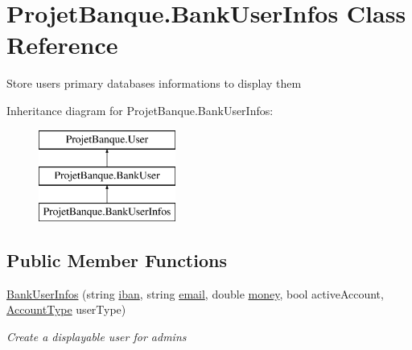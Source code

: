 \hypertarget{class_projet_banque_1_1_bank_user_infos}{}\section{Projet\+Banque.\+Bank\+User\+Infos Class Reference}
\label{class_projet_banque_1_1_bank_user_infos}


Store user\textquotesingle{}s primary databases informations to display them  


Inheritance diagram for Projet\+Banque.\+Bank\+User\+Infos\+:\begin{figure}[H]
\begin{center}
\leavevmode
\includegraphics[height=3.000000cm]{class_projet_banque_1_1_bank_user_infos}
\end{center}
\end{figure}
\subsection*{Public Member Functions}
\begin{DoxyCompactItemize}
\item 
\mbox{\hyperlink{class_projet_banque_1_1_bank_user_infos_a5e06a09646d8feca1f40d7a9d706772d}{Bank\+User\+Infos}} (string \mbox{\hyperlink{class_projet_banque_1_1_user_a52d4f7f22889d33e196357127ceb3ec3}{iban}}, string \mbox{\hyperlink{class_projet_banque_1_1_user_a7ee066f61ff3a59b05f003709548428a}{email}}, double \mbox{\hyperlink{class_projet_banque_1_1_bank_user_a070a143e326a9bec28b4123a8e0e7d8f}{money}}, bool active\+Account, \mbox{\hyperlink{class_projet_banque_1_1_user_a3ab673599238173c9d0ef40e731c0437}{Account\+Type}} user\+Type)
\begin{DoxyCompactList}\small\item\em Create a displayable user for admins \end{DoxyCompactList}\end{DoxyCompactItemize}

